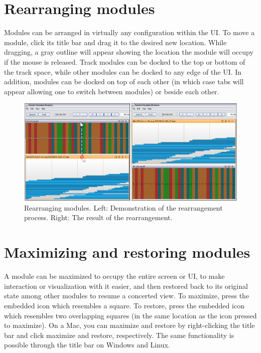 \documentclass{report}
\begin{document}
\section{Rearranging modules}

Modules can be arranged in virtually any configuration within the UI. To move a module, click its title bar and drag it to the desired new location. While dragging, a gray outline will appear showing the location the module will occupy if the mouse is released. Track modules can be docked to the top or bottom of the track space, while other modules can be docked to any edge of the UI. In addition, modules can be docked on top of each other (in which case tabs will appear allowing one to switch between modules) or beside each other.

\begin{figure}[!h]
\begin{center}
\includegraphics[type=png,ext=.png,read=.png,width=14cm]{images/arrangemodules}
\caption{Rearranging modules. Left: Demonstration of the rearrangement process. Right: The result of the rearrangement.  }
\label{rangecontrolpanel}
\end{center}
\end{figure}

\section{Maximizing and restoring modules}

A module can be maximized to occupy the entire screen or UI, to make interaction or visualization with it easier, and then restored back to its original state among other modules to resume a concerted view. To maximize, press the embedded icon which resembles a square. To restore, press the embedded icon which resembles two overlapping squares (in the same location as the icon pressed to maximize). On a Mac, you can maximize and restore by right-clicking the title bar and click maximize and restore, respectively. The same functionality is possible through the title bar on Windows and Linux.
\end{document}
